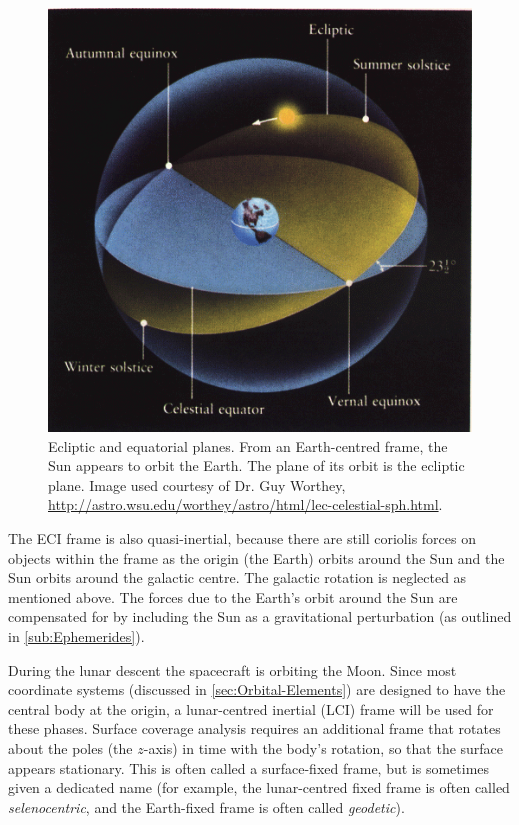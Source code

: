 \begin{figure} [htp]
\begin{center}
\includegraphics [scale=0.75]{Images/cel-sphere-2.png}
\end{center}
\caption{Ecliptic and equatorial planes. From an Earth-centred frame, the Sun appears to orbit the Earth. The plane of its orbit is the ecliptic plane. Image used courtesy of Dr. Guy Worthey, \url{http://astro.wsu.edu/worthey/astro/html/lec-celestial-sph.html}.}
\label{fig:Ecliptic-plane}
\end{figure}

The ECI frame is also quasi-inertial, because there are still coriolis forces on objects within the frame as the origin (the Earth) orbits around the Sun and the Sun orbits around the galactic centre. The galactic rotation is neglected as mentioned above. The forces due to the Earth's orbit around the Sun are compensated for by including the Sun as a gravitational perturbation (as outlined in \autoref{sub:Ephemerides}).

During the lunar descent the spacecraft is orbiting the Moon. Since most coordinate systems (discussed in \autoref{sec:Orbital-Elements}) are designed to have the central body at the origin, a lunar-centred inertial (LCI) frame will be used for these phases. Surface coverage analysis requires an additional frame that rotates about the poles (the $z$-axis) in time with the body's rotation, so that the surface appears stationary. This is often called a surface-fixed frame, but is sometimes given a dedicated name (for example, the lunar-centred fixed frame is often called \emph{selenocentric}, and the Earth-fixed frame is often called \emph{geodetic}).

